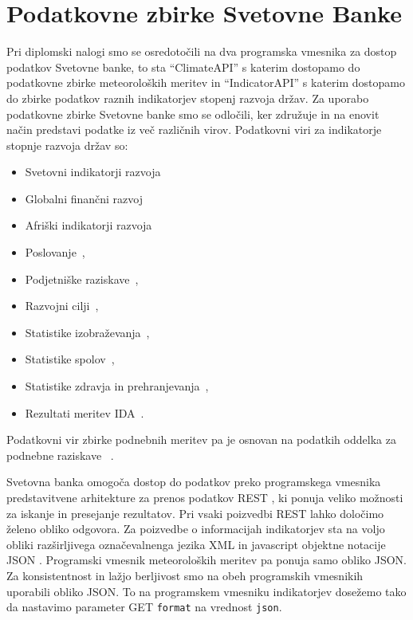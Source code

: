 \chapter{Podatkovne zbirke Svetovne Banke}

Pri diplomski nalogi smo se osredotočili na dva programska vmesnika za dostop 
podatkov Svetovne banke, to sta ``ClimateAPI'' s katerim dostopamo do 
podatkovne zbirke meteoroloških meritev in ``IndicatorAPI'' s katerim dostopamo do 
zbirke podatkov raznih indikatorjev stopenj razvoja držav.
Za uporabo podatkovne zbirke Svetovne banke smo se odločili, ker združuje in na
enovit način predstavi podatke iz več različnih virov. Podatkovni viri za 
indikatorje stopnje razvoja držav so:
\begin{itemize}  
  \item Svetovni indikatorji razvoja~\cite{world_dev_ind} %
  \item Globalni finančni razvoj~\cite{glob_fin_dev}
  \item Afriški indikatorji razvoja~\cite{africa_dev_ind}
  \item Poslovanje~\cite{doing_buseness},
  \item Podjetniške raziskave~\cite{ent_surveys}, 
  \item Razvojni cilji~\cite{mil_dev_goals}, 
  \item Statistike izobraževanja~\cite{edu_stat}, 
  \item Statistike spolov~\cite{gen_stat},
  \item Statistike zdravja in prehranjevanja~\cite{health_pop_stat},
  \item Rezultati meritev IDA~\cite{ida_res_mes_sys}.
\end{itemize}  

Podatkovni vir zbirke podnebnih meritev pa je osnovan na podatkih oddelka
za podnebne raziskave ~\cite{climate_data}.

Svetovna banka omogoča dostop do podatkov preko programskega vmesnika 
predstavitvene arhitekture za prenos podatkov REST 
, ki
ponuja veliko možnosti za iskanje in presejanje rezultatov. Pri vsaki 
poizvedbi REST lahko določimo želeno obliko odgovora. Za poizvedbe o 
informacijah indikatorjev sta na voljo obliki 
razširljivega označevalnenga jezika XML  
in javascript objektne notacije JSON . Programski vmesnik 
meteoroloških meritev pa ponuja samo obliko JSON. Za konsistentnost in lažjo
berljivost smo na obeh programskih vmesnikih uporabili obliko JSON. To na
programskem vmesniku indikatorjev dosežemo tako da nastavimo parameter GET
\verb|format| na vrednost \verb|json|. 


